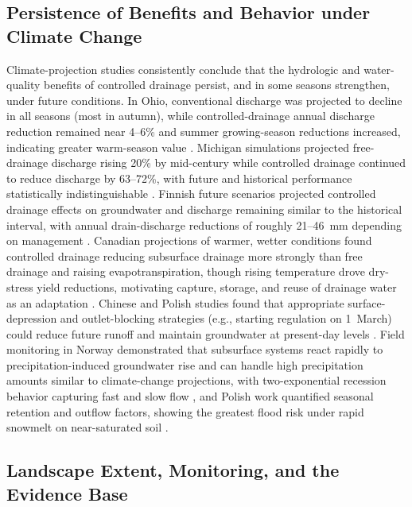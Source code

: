 \documentclass[11pt]{article}
\begin{document}
\subsection{Persistence of Benefits and Behavior under Climate Change}

Climate-projection studies consistently conclude that the hydrologic and
water-quality benefits of controlled drainage persist, and in some seasons
strengthen, under future conditions. In Ohio, conventional discharge was
projected to decline in all seasons (most in autumn), while controlled-drainage
annual discharge reduction remained near 4--6\% and summer growing-season
reductions increased, indicating greater warm-season value
\parencite{Pease2017}. Michigan simulations projected free-drainage discharge
rising 20\% by mid-century while controlled drainage continued to reduce
discharge by 63--72\%, with future and historical performance statistically
indistinguishable \parencite{BinShokrana2023}. Finnish future scenarios projected
controlled drainage effects on groundwater and discharge remaining similar to the
historical interval, with annual drain-discharge reductions of roughly
21--46~mm depending on management \parencite{Salla2022}. Canadian projections of
warmer, wetter conditions found controlled drainage reducing subsurface drainage
more strongly than free drainage and raising evapotranspiration, though rising
temperature drove dry-stress yield reductions, motivating capture, storage, and
reuse of drainage water as an adaptation \parencite{Ndulue2024}. Chinese and
Polish studies found that appropriate surface-depression and outlet-blocking
strategies (e.g., starting regulation on 1~March) could reduce future runoff and
maintain groundwater at present-day levels \parencite{Awad2021,Sojka2020}.
Field monitoring in Norway demonstrated that subsurface systems react rapidly to
precipitation-induced groundwater rise and can handle high precipitation amounts
similar to climate-change projections, with two-exponential recession behavior
capturing fast and slow flow \parencite{Deelstra2015}, and Polish work quantified
seasonal retention and outflow factors, showing the greatest flood risk under
rapid snowmelt on near-saturated soil \parencite{Szejba2020}.

\subsection{Landscape Extent, Monitoring, and the Evidence Base}
\end{document}
